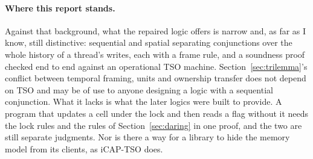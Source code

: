 \paragraph{Where this report stands.}
Against that background, what the repaired logic offers is narrow and, as
far as I know, still distinctive: sequential and spatial separating
conjunctions over the whole history of a thread's writes, each with a frame
rule, and a soundness proof checked end to end against an operational TSO
machine. Section~\ref{sec:trilemma}'s conflict between temporal framing,
units and ownership transfer does not depend on TSO and may be of use to
anyone designing a logic with a sequential conjunction. What it lacks is
what the later logics were built to provide. A program that updates a cell
under the lock and then reads a flag without it needs the lock rules and
the rules of Section~\ref{sec:daring} in one proof, and the two are still
separate judgments. Nor is there a way for a library to hide the memory
model from its clients, as iCAP-TSO does.
